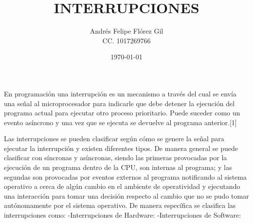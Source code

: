 \documentclass[a4paper]{article}
\title{INTERRUPCIONES}
\author{Andrés Felipe Flórez Gil \\ CC. 1017269766}
\date{\today}
\begin{document}
\maketitle

En programación una interrupción es un mecanismo a través del cual se envía una señal al microprocesador para indicarle que debe detener la ejecución del programa actual para ejecutar otro proceso prioritario. Puede suceder como un evento asíncrono y una vez que se ejecuta se devuelve al programa anterior.[1]

Las interrupciones se pueden clasificar según cómo se genere la señal para ejecutar la interrupción y existen diferentes tipos. De manera general se puede clasificar con síncronas y asíncronas, siendo las primeras provocadas por la ejecución de un programa dentro de la CPU, son internas al programa; y las segundas son provocadas por eventos externos al programa notificando al sistema operativo a cerca de algún cambio en el ambiente de operatividad y ejecutando una interacción para tomar una decisión respecto al cambio que no se pudo tomar autónomamente por el sistema operativo. De manera específica  se clasifica las interrupciones como:
-Interrupciones de Hardware:
-Interrupciones de Software:



\\
\end{document}
